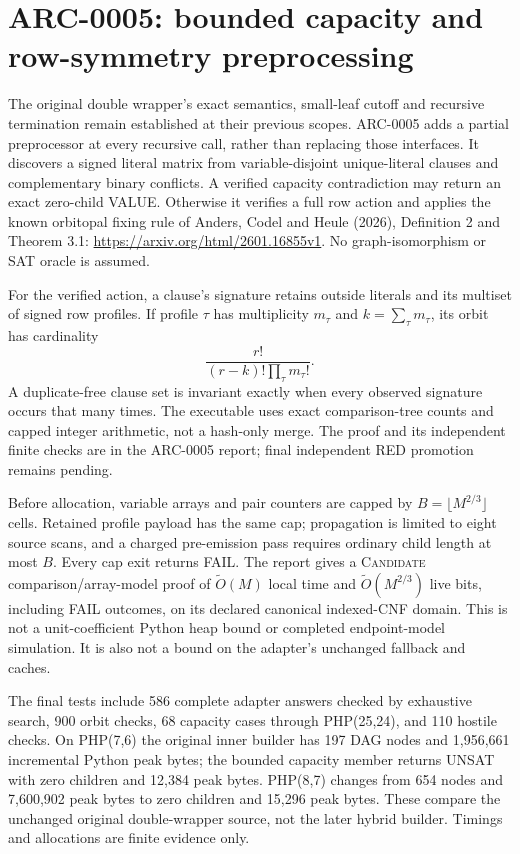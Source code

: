 \section{ARC-0005: bounded capacity and row-symmetry preprocessing}
The original double wrapper's exact semantics, small-leaf cutoff and
recursive termination remain established at their previous scopes.
ARC-0005 adds a partial preprocessor at every recursive call, rather than
replacing those interfaces. It discovers a signed literal matrix from
variable-disjoint unique-literal clauses and complementary binary conflicts.
A verified capacity contradiction may return an exact zero-child VALUE.
Otherwise it verifies a full row action and applies the known orbitopal
fixing rule of Anders, Codel and Heule (2026), Definition 2 and Theorem 3.1:
\url{https://arxiv.org/html/2601.16855v1}.
No graph-isomorphism or SAT oracle is assumed.

For the verified action, a clause's signature retains outside literals and
its multiset of signed row profiles. If profile $\tau$ has multiplicity
$m_\tau$ and $k=\sum_\tau m_\tau$, its orbit has cardinality
\[
 \frac{r!}{(r-k)!\prod_\tau m_\tau!}.
\]
A duplicate-free clause set is invariant exactly when every observed
signature occurs that many times. The executable uses exact comparison-tree
counts and capped integer arithmetic, not a hash-only merge. The proof and
its independent finite checks are in the ARC-0005 report; final independent
RED promotion remains pending.

Before allocation, variable arrays and pair counters are capped by
$B=\lfloor M^{2/3}\rfloor$ cells. Retained profile payload has the same cap;
propagation is limited to eight source scans, and a charged pre-emission pass
requires ordinary child length at most $B$. Every cap exit returns FAIL.
The report gives a \textsc{Candidate} comparison/array-model proof of
$\widetilde O(M)$ local time and $\widetilde O(M^{2/3})$ live bits, including
FAIL outcomes, on its declared canonical indexed-CNF domain. This is not a
unit-coefficient Python heap bound or completed endpoint-model simulation.
It is also not a bound on the adapter's unchanged fallback and caches.

The final tests include 586 complete adapter answers checked by exhaustive
search, 900 orbit checks, 68 capacity cases through PHP(25,24), and 110
hostile checks. On PHP(7,6) the original inner builder has 197 DAG nodes and
1,956,661 incremental Python peak bytes; the bounded capacity member returns
UNSAT with zero children and 12,384 peak bytes. PHP(8,7) changes from 654
nodes and 7,600,902 peak bytes to zero children and 15,296 peak bytes.
These compare the unchanged original double-wrapper source, not the later
hybrid builder. Timings and allocations are finite evidence only.

